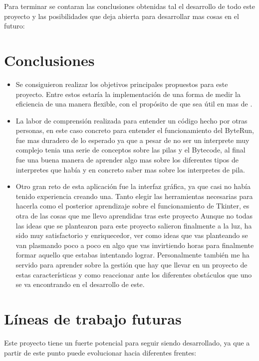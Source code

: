 
Para terminar se contaran las conclusiones obtenidas tal el desarrollo de todo este proyecto y las posibilidades que deja abierta para desarrollar mas cosas en el futuro:
\section{Conclusiones}
\begin{itemize}
	\item Se consiguieron realizar los objetivos principales propuestos para este proyecto. Entre estos estaría la implementación de una forma de medir la eficiencia de una manera flexible, con el propósito de que sea útil en mas de .
	\item La labor de comprensión realizada para entender un código hecho por otras personas, en este caso concreto para entender el funcionamiento del ByteRun, fue mas duradero de lo esperado ya que a pesar de no ser un interprete muy complejo tenia una serie de conceptos sobre las pilas y el Bytecode, al final fue una buena manera de aprender algo mas sobre los diferentes tipos de interpretes que había y en concreto saber mas sobre los interpretes de pila.
	\item Otro gran reto de esta aplicación fue la interfaz gráfica, ya que casi no había tenido experiencia creando una. Tanto elegir las herramientas necesarias para hacerla como el posterior aprendizaje sobre el funcionamiento de Tkinter, es otra de las cosas que me llevo aprendidas tras este proyecto
Aunque no todas las ideas que se plantearon para este proyecto salieron finalmente a la luz, ha sido muy satisfactorio y enriquecedor, ver como ideas que vas planteando se van plasmando poco a poco en algo que vas invirtiendo horas para finalmente formar aquello que estabas intentando lograr. Personalmente también me ha servido para aprender sobre la gestión que hay que llevar en un proyecto de estas características y como reaccionar ante los diferentes obstáculos que uno se va encontrando en el desarrollo de este.
\end{itemize}


\section{Líneas de trabajo futuras}
Este proyecto tiene un fuerte potencial para seguir siendo desarrollado, ya que a partir de este punto puede evolucionar hacia diferentes frentes:\\

